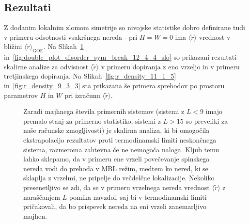 \subsection{Rezultati}
Z dodanim lokalnim zlomom simetrije so nivojske statistike dobro definirane tudi v primeru odsotnosti vsakršnega nereda - pri $H=W=0$ ima $\langle \tilde{r}\rangle$ vrednost v bližini  $\langle \tilde{r}\rangle_\mathrm{GOE}$. Na Slikah~\ref{fig:double_plot_disorder_sym_break_13_1_6_slo} in~\ref{fig:double_plot_disorder_sym_break_12_4_4_slo} so prikazani rezultati skalirne analize za odvisnost $\langle \tilde{r}\rangle$ v primeru dopiranja z eno vrzeljo in v primeru tretjinskega dopiranja. Na Slikah~\ref{fig:r_density_11_1_5} in~\ref{fig:r_density_9_3_3} sta prikazana še primera sprehodov po prostoru parametrov $H$ in $W$ pri izračunu $\langle \tilde{r} \rangle$.
 \begin{figure}[H]
\caption{Zaradi majhnega števila primernih sistemov (sistemi z $L<9$ imajo premalo stanj za primerno statistiko, sistemi z $L>15$ so preveliki za naše računske zmogljivosti) je skalirna analiza, ki bi omogočila ekstrapolacijo rezultatov proti termodinamski limiti neskončnega sistema, razmeroma zahtevna če ne nemogoča naloga. Kljub temu lahko sklepamo, da v primeru ene vrzeli povečevanje spinskega nereda vodi do prehoda v MBL režim, medtem ko nered, ki se sklaplja z vrzelmi, ne pripelje do večdelčne lokalizacije. Nekoliko presenetljivo se zdi, da se v primeru vrzelnega nereda vrednost $\langle \tilde{r}\rangle$ z naraščanjem $L$ pomika navzdol, saj bi v termodinamski limiti pričakovali, da bo prispevek nereda na eni vrzeli zanemarljivo majhen. }
\label{fig:double_plot_disorder_sym_break_13_1_6_slo}
\end{figure} 
